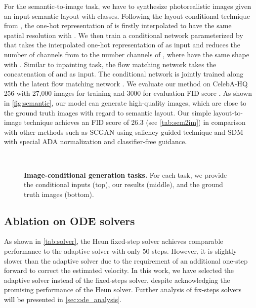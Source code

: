 \documentclass{article}
\newcommand{\minisection}[1]{\vspace{2mm}\noindent{\textbf{#1}}}
\theoremstyle{plain}
\theoremstyle{definition}
\theoremstyle{remark}
\begin{document}
\minisection{Semantic-to-image.} For the semantic-to-image task, we have to synthesize photorealistic images given an input semantic layout  with  classes. Following the layout conditional technique from \cite{rombach2022high}, the one-hot representation of  is firstly interpolated to have the same spatial resolution with . We then train a conditional network  parameterized by  that takes the interpolated one-hot representation of  as input and reduces the number of channels from  to the number channels of ,  where  have the same shape with . Similar to inpainting task, the flow matching network  takes the concatenation of  and  as input. The conditional network  is jointly trained along with the latent flow matching network . We evaluate our method on CelebA-HQ 256 \cite{karras2017progressive} with 27,000 images for training and 3000 for evaluation FID score \cite{heusel2017gans}. As shown in \cref{fig:semantic}, our model can generate high-quality images, which are close to the ground truth images with regard to semantic layout. Our simple layout-to-image technique achieves an FID score of 26.3 (see \cref{tab:sem2im}) in comparison with other methods such as SCGAN \cite{wang2021image} using saliency guided technique and SDM \cite{wang2022semantic} with special ADA normalization and classifier-free guidance.


\begin{figure}[!ht]
\centering
{}
~
\caption{\textbf{Image-conditional generation tasks.} For each task, we provide the conditional inputs (top), our results (middle), and the ground truth images (bottom).}
    \label{fig:my_label}
\vspace{-4mm}
\end{figure}

\subsection{Ablation on ODE solvers}
\label{ssec:solvers}


    
As shown in \cref{tab:solver}, the Heun fixed-step solver achieves comparable performance to the adaptive solver with only 50 steps. However, it is slightly slower than the adaptive solver due to the requirement of an additional one-step forward to correct the estimated velocity. In this work, we have selected the adaptive solver instead of the fixed-steps solver, despite acknowledging the promising performance of the Heun solver. Further analysis of fix-steps solvers will be presented in \cref{sec:ode_analysis}.
\label{sec:solvers}
\end{document}
